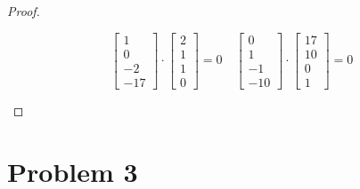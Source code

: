 \documentclass[12pt]{article}
\newcommand{\sect}[1]{\section*{#1}}
\begin{document}
\begin{proof}
\begin{itemize}
\[\begin{bmatrix}
      1\\0\\-2\\-17
    \end{bmatrix}\cdot
    \begin{bmatrix}
      2\\1\\1\\0
    \end{bmatrix}=0\quad
    \begin{bmatrix}
      0\\1\\-1\\-10
    \end{bmatrix}\cdot\begin{bmatrix}
      17\\10\\0\\1
  \end{bmatrix}=0
    \]
  \end{itemize}
\end{proof}
\sect{Problem 3}
\end{document}
